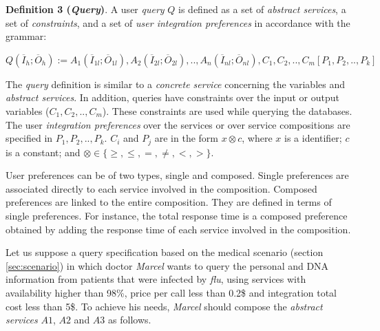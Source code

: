 \bigskip

\noindent \textbf{Definition 3 (\textit{Query})}.
A user \textit{query} $Q$ is defined as a set of \textit{abstract services}, a set of \textit{constraints}, and a set of \textit{user integration preferences} in accordance with the grammar:
%
\begin{center}
\small
\begin{math}
Q (\overline{I}_{h}; \overline{O}_{h}) := A_{1}(\overline{I}_{1l};
\overline{O}_{1l}), A_{2}(\overline{I}_{2l}; \overline{O}_{2l}), ..,  A_{n}(\overline{I}_{nl}; \overline{O}_{nl}),C_{1},C_{2}, .., C_{m}[P_{1},P_{2}, .., P_{k}]
\end{math}
\end{center}
%
The \textit{query} definition is similar to a \textit{concrete service} concerning the variables and \textit{abstract services}. In addition, queries have constraints over the input or output variables ($C_{1}, C_{2}, .., C_{m}$). These constraints are used while querying the databases. The user \textit{integration preferences} over the services or over service compositions are specified in $P_{1}, P_{2}, .., P_{k}$. $C_{i}$ and $P_{j}$ are in the form $x \otimes c$, where $x$ is a identifier; $c$ is a constant; and $\otimes \in\lbrace \geq, \leq, =, \neq, <, >\rbrace$.
%

User preferences can be of two types, single and composed. Single preferences
are associated directly to each service involved in the composition. Composed
preferences are linked to the entire composition. They are defined in terms of
single preferences. For instance, the total response time is a composed
preference obtained by adding the response time of each service involved in the composition.

Let us suppose a query specification based on the medical scenario (section \ref{sec:scenario}) in which doctor \textit{Marcel} wants to query the personal and DNA information from patients that were infected by \textit{flu}, using services with availability higher than 98\%, price per call less than 0.2\$ and integration total cost less than 5\$.
To achieve his needs, \textit{Marcel} should compose the \textit{abstract services} $A1$, $A2$ and $A3$ as follows. 

